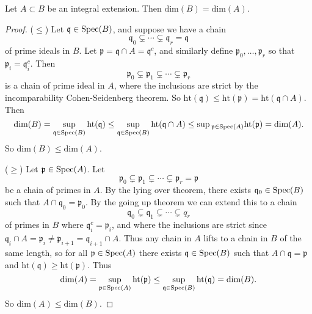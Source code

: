 \documentclass[12pt]{article}
\begin{document}
\begin{proposition}
	Let $A\subset B$ be an integral extension. Then $\text{dim}(B) = \text{dim}(A)$.
\end{proposition}
\begin{proof}
	($\leq$) Let $\mathfrak{q}\in\text{Spec}(B)$, and suppose we have a chain 
	\begin{equation*}
		\mathfrak{q}_0\subsetneq\cdots\subsetneq\mathfrak{q}_r=\mathfrak{q}
	\end{equation*}
	of prime ideals in $B$. Let $\mathfrak{p}=\mathfrak{q}\cap A=\mathfrak{q}^c$, and similarly define $\mathfrak{p}_0,\dots,\mathfrak{p}_r$ so that $\mathfrak{p}_i=\mathfrak{q}_i^c$. Then 
	\begin{equation*}
		\mathfrak{p}_0\subsetneq\mathfrak{p}_1\subsetneq\cdots\subsetneq\mathfrak{p}_r 
	\end{equation*}
	is a chain of prime ideal in $A$, where the inclusions are strict by the incomparability Cohen-Seidenberg theorem. So $\text{ht}(\mathfrak{q})\leq\text{ht}(\mathfrak{p})=\text{ht}(\mathfrak{q}\cap A)$. Then 
	\begin{equation*}
		\text{dim}(B) = \sup_{\mathfrak{q}\in\text{Spec}(B)}\text{ht}(\mathfrak{q})\leq\sup_{\mathfrak{q}\in\text{Spec}(B)}\text{ht}(\mathfrak{q}\cap A)\leq\sup{_{\mathfrak{p}\in\text{Spec}(A)}}\text{ht}(\mathfrak{p})=\text{dim}(A).
	\end{equation*}
	So $\text{dim}(B)\leq\text{dim}(A)$.

	($\geq$) Let $\mathfrak{p}\in\text{Spec}(A)$. Let 
	\begin{equation*}
		\mathfrak{p}_0\subsetneq\mathfrak{p}_1\subsetneq\cdots\subsetneq\mathfrak{p}_r=\mathfrak{p}
	\end{equation*}
	be a chain of primes in $A$. By the lying over theorem, there exists $\mathfrak{q}_0\in\text{Spec}(B)$ such that $A\cap \mathfrak{q}_0=\mathfrak{p}_0$. By the going up theorem we can extend this to a chain 
	\begin{equation*}
		\mathfrak{q}_0\subsetneq\mathfrak{q}_1\subsetneq\cdots\subsetneq q_r
	\end{equation*}
	of primes in $B$ where $\mathfrak{q}_i^c=\mathfrak{p}_i$, and where the inclusions are strict since $\mathfrak{q}_i\cap A=\mathfrak{p}_i\neq\mathfrak{p}_{i+1}=\mathfrak{q}_{i+1}\cap A$. Thus any chain in $A$ lifts to a chain in $B$ of the same length, so for all $\mathfrak{p}\in\text{Spec}(A)$ there exists $\mathfrak{q}\in\text{Spec}(B)$ such that $A\cap \mathfrak{q}=\mathfrak{p}$ and $\text{ht}(\mathfrak{q})\geq\text{ht}(\mathfrak{p})$. Thus 
	\begin{equation*}
		\text{dim}(A)=\sup_{\mathfrak{p}\in\text{Spec}(A)}\text{ht}(\mathfrak{p})\leq\sup_{\mathfrak{q}\in\text{Spec}(B)}\text{ht}(\mathfrak{q})=\text{dim}(B).
	\end{equation*}
	So $\text{dim}(A)\leq\text{dim}(B)$.
\end{proof}
\end{document}
